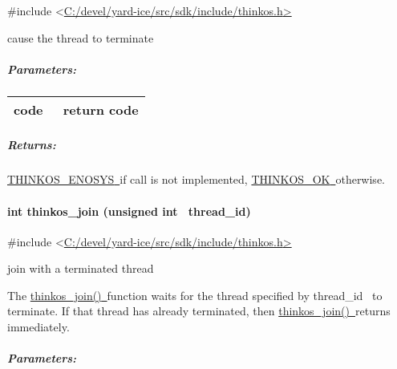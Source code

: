 {{}

{\#include
\textless{}}{\protect\hyperlink{h.pkwqa1}{C:/devel/yard-ice/src/sdk/include/thinkos.h}}{\protect\hyperlink{h.pkwqa1}{\textgreater{}}}

{cause the thread to terminate }

{}

\subparagraph{\texorpdfstring{{Parameters:}}{Parameters:}}\label{parameters-3}

\protect\hypertarget{t.bc406d26b6ef312038598e48649c4000f5d76cf9}{}{}\protect\hypertarget{t.3}{}{}

\begin{longtable}[]{@{}ll@{}}
\toprule
\begin{minipage}[t]{0.47\columnwidth}\raggedright\strut
{code}{~}\strut
\end{minipage} & \begin{minipage}[t]{0.47\columnwidth}\raggedright\strut
{return code }\strut
\end{minipage}\tabularnewline
\bottomrule
\end{longtable}

\subparagraph{\texorpdfstring{{Returns:}}{Returns:}}\label{returns-4}

{\protect\hyperlink{h.3s49zyc}{THINKOS\_ENOSYS}}{\protect\hyperlink{h.3s49zyc}{~}}{if
call is not implemented,
}{\protect\hyperlink{h.2fk6b3p}{THINKOS\_OK}}{\protect\hyperlink{h.2fk6b3p}{~}}{otherwise.
}

\paragraph{\texorpdfstring{{int thinkos\_join (unsigned int
~thread\_id)}}{int thinkos\_join (unsigned int ~thread\_id)}}\label{int-thinkos_join-unsigned-int-thread_id}

{}

{\#include
\textless{}}{\protect\hyperlink{h.pkwqa1}{C:/devel/yard-ice/src/sdk/include/thinkos.h}}{\protect\hyperlink{h.pkwqa1}{\textgreater{}}}

{join with a terminated thread }

{The
}{\protect\hyperlink{h.1t3h5sf}{thinkos\_join()}}{\protect\hyperlink{h.1t3h5sf}{~}}{function
waits for the thread specified by }{thread\_id}{~ to terminate. If that
thread has already terminated, then
}{\protect\hyperlink{h.1t3h5sf}{thinkos\_join()}}{\protect\hyperlink{h.1t3h5sf}{~}}{returns
immediately.}

\subparagraph{\texorpdfstring{{Parameters:}}{Parameters:}}\label{parameters-4}

}
